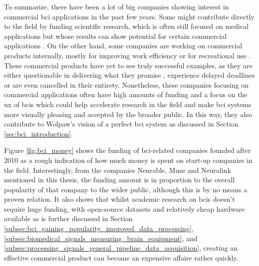 To summarize, there have been a lot of big companies showing interest in commercial \gls{bci} applications in the past few years.
Some might contribute directly to the field by funding scientific research, which is often still focused on medical applications but whose results can show potential for certain commercial applications \citep{facebook_bci_blog, facebook_bci_keyboard, neuralink_whitepaper}.
On the other hand, some companies are working on commercial products internally, mostly for improving work efficiency \citep{fb_building8, bci_nude_detection} or for recreational use \citep[Muse and InteraXon headband,][]{valve_bci_interest}.
These commercial products have yet to see truly successful examples, as they are either questionable in delivering what they promise \citep{interaxon_tests}, experience delayed deadlines or are even cancelled in their entirety.
Nonetheless, these companies focusing on commercial applications often have high amounts of funding and a focus on the \gls{ux} of \glspl{bci} which could help accelerate research in the field and make \gls{bci} systems more visually pleasing and accepted by the broader public.
In this way, they also contribute to Wolpaw's vision of a perfect \gls{bci} system as discussed in Section \ref{sec:bci_introduction}.

Figure \ref{fig:bci_money} shows the funding of \gls{bci}-related companies founded after 2010 as a rough indication of how much money is spent on start-up companies in the field.
Interestingly, from the companies Neurable, Muse and Neuralink mentioned in this thesis, the funding amount is in proportion to the overall popularity of that company to the wider public, although this is by no means a proven relation.
It also shows that whilst academic research on \glspl{bci} doesn't require huge funding, with open-source datasets and relatively cheap hardware available as is further discussed in Section \ref{subsec:bci_gaining_popularity_improved_data_processing}, \ref{subsec:biomedical_signals_measuring_brain_equipment}, and \ref{subsec:processing_signals_general_pipeline_data_acquisition}, creating an effective commercial product can become an expensive affaire rather quickly.

